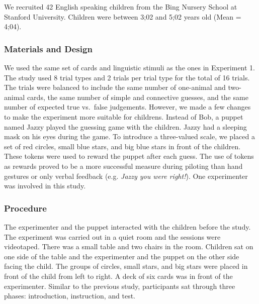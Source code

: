 \documentclass[10pt, letterpaper]{article}
\begin{document}
We recruited 42 English speaking children from the Bing Nursery School
at Stanford University. Children were between 3;02 and 5;02 years old
(Mean = 4;04).

\subsubsection{Materials and Design}\label{materials-and-design-1}

We used the same set of cards and linguistic stimuli as the ones in
Experiment 1. The study used 8 trial types and 2 trials per trial type
for the total of 16 trials. The trials were balanced to include the same
number of one-animal and two-animal cards, the same number of simple and
connective guesses, and the same number of expected true vs.~false
judgements. However, we made a few changes to make the experiment more
suitable for childrens. Instead of Bob, a puppet named Jazzy played the
guessing game with the children. Jazzy had a sleeping mask on his eyes
during the game. To introduce a three-valued scale, we placed a set of
red circles, small blue stars, and big blue stars in front of the
children. These tokens were used to reward the puppet after each guess.
The use of tokens as rewards proved to be a more successful measure
during piloting than hand gestures or only verbal feedback (e.g.
\emph{Jazzy you were right!}). One experimenter was involved in this
study.

\subsubsection{Procedure}\label{procedure-1}

The experimenter and the puppet interacted with the children before the
study. The experiment was carried out in a quiet room and the sessions
were videotaped. There was a small table and two chairs in the room.
Children sat on one side of the table and the experimenter and the
puppet on the other side facing the child. The groups of circles, small
stars, and big stars were placed in front of the child from left to
right. A deck of six cards was in front of the experimenter. Similar to
the previous study, participants sat through three phases: introduction,
instruction, and test.
\end{document}
